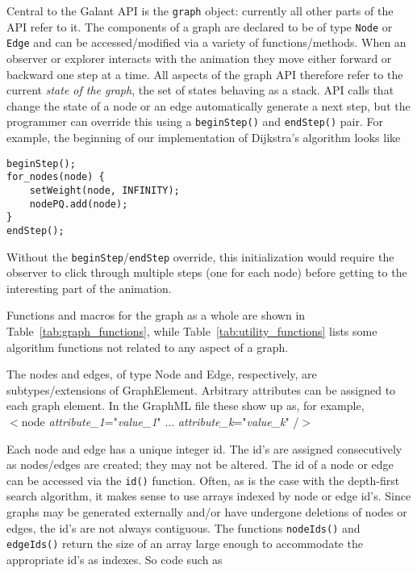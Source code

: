 Central to the Galant API is the \texttt{graph} object: currently all other
parts of the API refer to it.
The components of a graph are declared to be of type \texttt{Node} or
\texttt{Edge} and can be accessed/modified via a variety of
functions/methods.
When an observer or explorer interacts with the animation they move either
forward or backward one step at a time.
All aspects of the graph API therefore refer to the current \emph{state of
  the graph}, the set of states behaving as a stack.
API calls that change the state of a node or an edge automatically
generate a next step,
but the programmer can override this using a \texttt{beginStep()} and
\texttt{endStep()} pair. For example, the beginning of our implementation of
Dijkstra's algorithm looks like
\begin{verbatim}
beginStep();
for_nodes(node) {
    setWeight(node, INFINITY);
    nodePQ.add(node);
}
endStep();
\end{verbatim}
Without the \texttt{beginStep}/\texttt{endStep}
override, this initialization would require the observer to click
through multiple steps (one for each node) before getting to the interesting
part of the animation.





Functions and macros for the graph as a whole are shown in Table~\ref{tab:graph_functions}, while Table~\ref{tab:utility_functions} lists some algorithm functions not related to any aspect of a graph.

The nodes and edges, of type \textsf{Node} and \textsf{Edge}, respectively,
are subtypes/extensions of \textsf{GraphElement}.
Arbitrary attributes can be assigned to each graph element. In the GraphML file
these show up as, for example,\\
\hspace*{3em}
\textsf{
$<$node \emph{attribute\_1}="\emph{value\_1}" ... \emph{attribute\_k}="\emph{value\_k}" /$>$
}

Each node and edge has a unique integer id.
The id's are assigned consecutively as nodes/edges are created;
they may not be altered.
The id of a node or edge can be accessed via the \texttt{id()} function.
Often, as is the case with the depth-first search algorithm, it makes sense to use
arrays indexed by node or edge id's.
Since graphs may be generated externally and/or have undergone deletions of nodes or
edges, the id's are not always contiguous.
The functions \texttt{nodeIds()} and \texttt{edgeIds()} return the size of an array
large enough to accommodate the appropriate id's as indexes. So code such as

